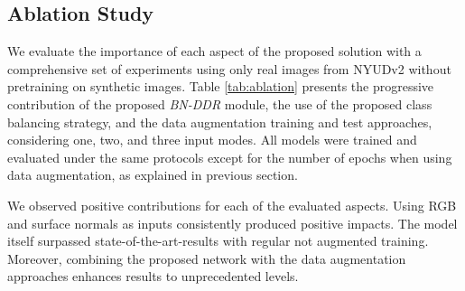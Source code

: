 \subsection{Ablation Study}

We evaluate the importance of each aspect of the proposed solution with a comprehensive set of experiments using only real images from NYUDv2 without pretraining on synthetic images.
Table \ref{tab:ablation} presents the progressive contribution of the proposed \emph{BN-DDR} module, the use of the proposed class balancing strategy, and the data augmentation training and test approaches, considering one, two, and three input modes. All models were trained and evaluated under the same protocols except for the number of epochs when using data augmentation, as explained in previous section.



We observed positive contributions for each of the evaluated aspects. Using RGB and surface normals as inputs consistently produced positive impacts. The model itself surpassed state-of-the-art-results with regular not augmented training. Moreover, combining the proposed network with the data augmentation approaches enhances results to unprecedented levels.


\begingroup
\setlength{\tabcolsep}{2pt} \renewcommand{\arraystretch}{1} 

